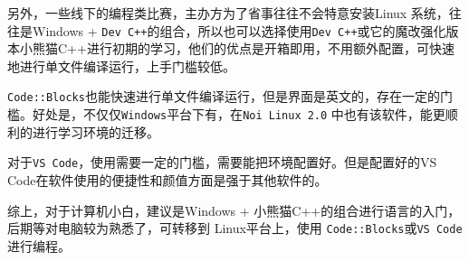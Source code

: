 另外，一些线下的编程类比赛，主办方为了省事往往不会特意安装Linux 系统，往往是Windows + \texttt{Dev C++}的组合，所以也可以选择使用\texttt{Dev C++}或它的魔改强化版本小熊猫C++进行初期的学习，他们的优点是开箱即用，不用额外配置，可快速地进行单文件编译运行，上手门槛较低。

\texttt{Code::Blocks}也能快速进行单文件编译运行，但是界面是英文的，存在一定的门槛。好处是，不仅仅\texttt{Windows}平台下有，在\texttt{Noi Linux 2.0} 中也有该软件，能更顺利的进行学习环境的迁移。

对于\texttt{VS Code}，使用需要一定的门槛，需要能把环境配置好。但是配置好的VS Code在软件使用的便捷性和颜值方面是强于其他软件的。

综上，对于计算机小白，建议是Windows + 小熊猫C++的组合进行语言的入门，后期等对电脑较为熟悉了，可转移到 Linux平台上，使用 \texttt{Code::Blocks}或\texttt{VS Code}进行编程。


